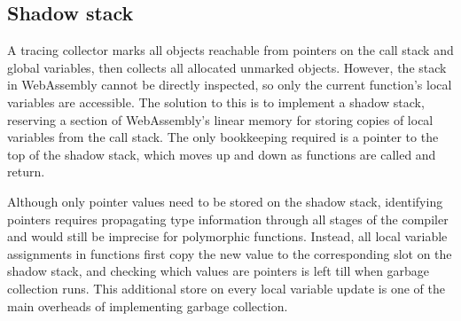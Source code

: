 
\subsection{Shadow stack}
A tracing collector marks all objects reachable from pointers on the call stack and global variables, then collects all allocated unmarked objects. However, the stack in WebAssembly cannot be directly inspected, so only the current function's local variables are accessible. The solution to this is to implement a shadow stack, reserving a section of WebAssembly's linear memory for storing copies of local variables from the call stack. The only bookkeeping required is a pointer to the top of the shadow stack, which moves up and down as functions are called and return.

Although only pointer values need to be stored on the shadow stack, identifying pointers requires propagating type information through all stages of the compiler and would still be imprecise for polymorphic functions. Instead, all local variable assignments in functions first copy the new value to the corresponding slot on the shadow stack, and checking which values are pointers is left till when garbage collection runs. This additional store on every local variable update is one of the main overheads of implementing garbage collection.


